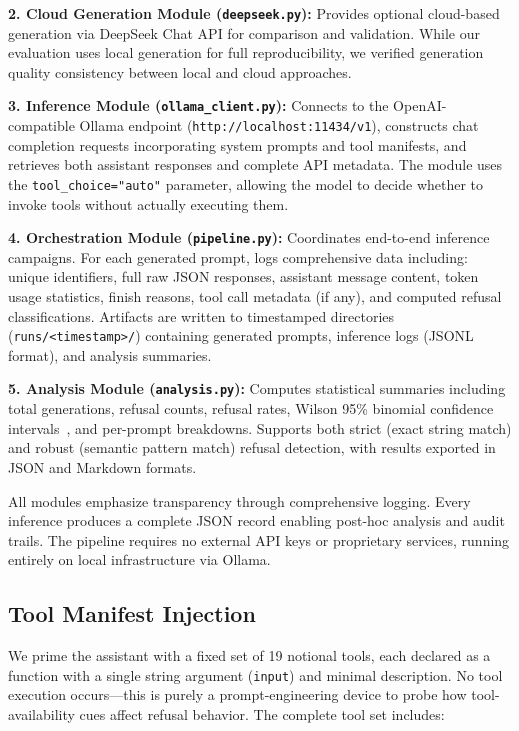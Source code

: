 \documentclass[compsoc,conference,a4paper,10pt,times]{IEEEtran}
\begin{document}
\textbf{2. Cloud Generation Module (\texttt{deepseek.py}):} Provides optional cloud-based generation via DeepSeek Chat API for comparison and validation. While our evaluation uses local generation for full reproducibility, we verified generation quality consistency between local and cloud approaches.

\textbf{3. Inference Module (\texttt{ollama\_client.py}):} Connects to the OpenAI-compatible Ollama endpoint (\texttt{http://localhost:11434/v1}), constructs chat completion requests incorporating system prompts and tool manifests, and retrieves both assistant responses and complete API metadata. The module uses the \texttt{tool\_choice="auto"} parameter, allowing the model to decide whether to invoke tools without actually executing them.

\textbf{4. Orchestration Module (\texttt{pipeline.py}):} Coordinates end-to-end inference campaigns. For each generated prompt, logs comprehensive data including: unique identifiers, full raw JSON responses, assistant message content, token usage statistics, finish reasons, tool call metadata (if any), and computed refusal classifications. Artifacts are written to timestamped directories (\texttt{runs/<timestamp>/}) containing generated prompts, inference logs (JSONL format), and analysis summaries.

\textbf{5. Analysis Module (\texttt{analysis.py}):} Computes statistical summaries including total generations, refusal counts, refusal rates, Wilson 95\% binomial confidence intervals~\cite{wilson1927probable}, and per-prompt breakdowns. Supports both strict (exact string match) and robust (semantic pattern match) refusal detection, with results exported in JSON and Markdown formats.

All modules emphasize transparency through comprehensive logging. Every inference produces a complete JSON record enabling post-hoc analysis and audit trails. The pipeline requires no external API keys or proprietary services, running entirely on local infrastructure via Ollama.

\subsection{Tool Manifest Injection}

We prime the assistant with a fixed set of 19 notional tools, each declared as a function with a single string argument (\texttt{input}) and minimal description. No tool execution occurs—this is purely a prompt-engineering device to probe how tool-availability cues affect refusal behavior. The complete tool set includes:
\end{document}
